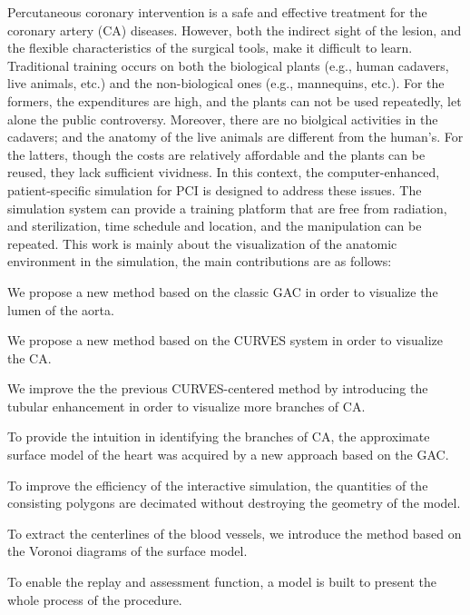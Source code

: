 
\begin{englishabstract}

Percutaneous coronary intervention is a safe and effective treatment for the coronary artery (CA) diseases.
However, both the indirect sight of the lesion, and the flexible characteristics of the surgical tools, make it difficult to learn. 
Traditional training occurs on both the biological plants (e.g., human cadavers, live animals, etc.) and the non-biological ones (e.g., mannequins, etc.). 
For the formers, the expenditures are high, and the plants can not be used repeatedly, let alone the public controversy. 
Moreover, there are no biolgical activities in the cadavers; and the anatomy of the live animals are different from the human's.
For the latters, though the costs are relatively affordable and the plants can be reused, they lack sufficient vividness. 
In this context, the computer-enhanced, patient-specific simulation for PCI is designed to address these issues. 
The simulation system can provide a training platform that are free from radiation, and sterilization, time schedule and location, and the manipulation can be repeated. 
This work is mainly about the visualization of the anatomic environment in the simulation, the main contributions are as follows: 

We propose a new method based on the classic GAC in order to visualize the lumen of the aorta. 

We propose a new method based on the CURVES system in order to visualize the CA. 

We improve the the previous CURVES-centered method by introducing the tubular enhancement in order to visualize more branches of CA.

To provide the intuition in identifying the branches of CA, the approximate surface model of the heart was acquired by a new approach based on the GAC. 

To improve the efficiency of the interactive simulation, the quantities of the consisting polygons are decimated without destroying the geometry of the model.

To extract the centerlines of the blood vessels, we introduce the method based on the Voronoi diagrams of the surface model. 

To enable the replay and assessment function, a model is built to present the whole process of the procedure.

%
\end{englishabstract}
